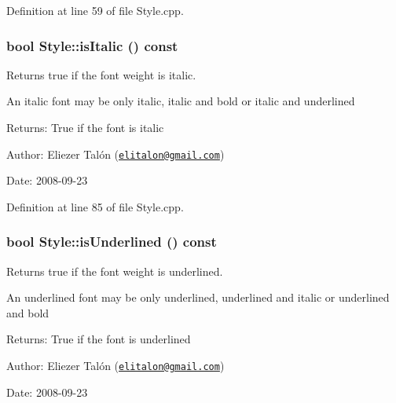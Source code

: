 Definition at line 59 of file Style.cpp.\hypertarget{class_style_5d57a686b93123e8ca5f8f91afb596c1}{
\subsubsection[isItalic]{\setlength{\rightskip}{0pt plus 5cm}bool Style::isItalic () const}}
\label{class_style_5d57a686b93123e8ca5f8f91afb596c1}


Returns true if the font weight is italic. 

An italic font may be only italic, italic and bold or italic and underlined

\begin{Desc}
\item[Returns:]True if the font is italic\end{Desc}
\begin{Desc}
\item[Author:]Eliezer Talón (\href{mailto:elitalon@gmail.com}{\tt elitalon@gmail.com}) \end{Desc}
\begin{Desc}
\item[Date:]2008-09-23 \end{Desc}


Definition at line 85 of file Style.cpp.\hypertarget{class_style_d1fcc32d8b565aae007012eb603fedcd}{
\subsubsection[isUnderlined]{\setlength{\rightskip}{0pt plus 5cm}bool Style::isUnderlined () const}}
\label{class_style_d1fcc32d8b565aae007012eb603fedcd}


Returns true if the font weight is underlined. 

An underlined font may be only underlined, underlined and italic or underlined and bold

\begin{Desc}
\item[Returns:]True if the font is underlined\end{Desc}
\begin{Desc}
\item[Author:]Eliezer Talón (\href{mailto:elitalon@gmail.com}{\tt elitalon@gmail.com}) \end{Desc}
\begin{Desc}
\item[Date:]2008-09-23 \end{Desc}



